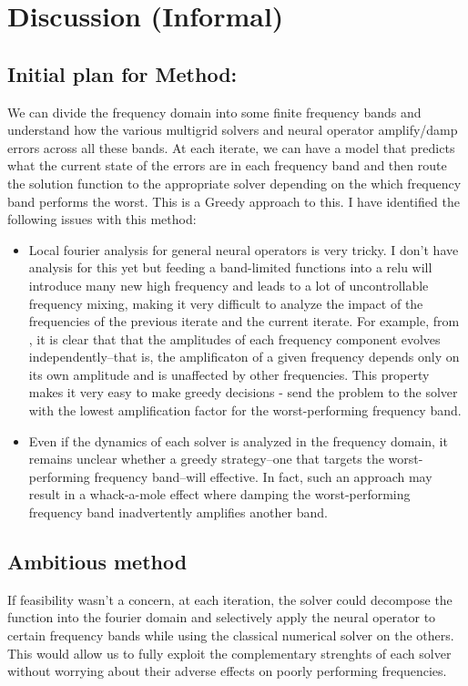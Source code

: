 \documentclass[12pt]{article}
\begin{document}
\section{Discussion (Informal)}

\subsection{Initial plan for Method:}

We can divide the frequency domain into some finite frequency bands and understand how the various multigrid solvers and neural operator amplify/damp errors across all these bands. At each iterate, we can have a model that predicts what the current state of the errors are in each frequency band and then route the solution function to the appropriate solver depending on the which frequency band performs the worst. This is a Greedy approach to this. I have identified the following issues with this method:
\begin{itemize}
    \item Local fourier analysis for general neural operators is very tricky. I don't have analysis for this yet but feeding a band-limited functions into a relu will introduce many new high frequency and leads to a lot of uncontrollable frequency mixing, making it very difficult to analyze the impact of the frequencies of the previous iterate and the current iterate. For example, from , it is clear that that the amplitudes of each frequency component evolves independently--that is, the amplificaton of a given frequency depends only on its own amplitude and is unaffected by other frequencies. This property makes it very easy to make greedy decisions - send the problem to the solver with the lowest amplification factor for the worst-performing frequency band. 
    \item Even if the dynamics of each solver is analyzed in the frequency domain, it remains unclear whether a greedy strategy--one that targets the worst-performing frequency band--will effective. In fact, such an approach may result in a whack-a-mole effect where damping the worst-performing frequency band inadvertently amplifies another band.
\end{itemize}

\subsection{Ambitious method}

If feasibility wasn't a concern, at each iteration, the solver could decompose the function into the fourier domain and selectively apply the neural operator to certain frequency bands while using the classical numerical solver on the others. This would allow us to fully exploit the complementary strenghts of each solver without worrying about their adverse effects on poorly performing frequencies.
\end{document}
